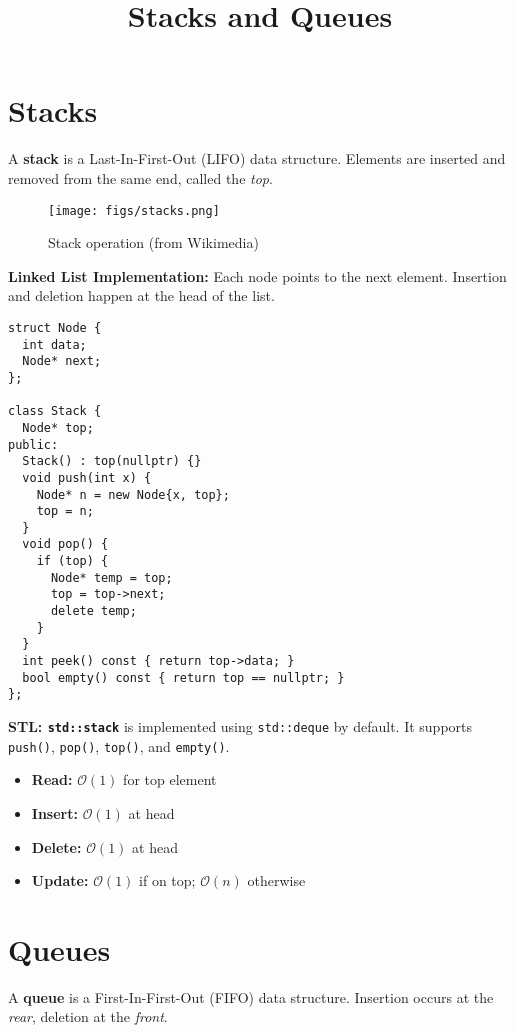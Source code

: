 \documentclass{article}
\title{Stacks and Queues}
\author{}
\date{}
\begin{document}
\maketitle


\section{Stacks}
A \textbf{stack} is a Last-In-First-Out (LIFO) data structure. Elements are inserted and removed from the same end, called the \textit{top}.

\begin{figure}[h]
  \centering
  \texttt{[image: figs/stacks.png]}
  \caption{Stack operation (from Wikimedia)}
  \label{fig:stack}
\end{figure}

\textbf{Linked List Implementation:}
Each node points to the next element. Insertion and deletion happen at the head of the list.

\begin{lstlisting}[style=cppstyle]
struct Node {
  int data;
  Node* next;
};

class Stack {
  Node* top;
public:
  Stack() : top(nullptr) {}
  void push(int x) {
    Node* n = new Node{x, top};
    top = n;
  }
  void pop() {
    if (top) {
      Node* temp = top;
      top = top->next;
      delete temp;
    }
  }
  int peek() const { return top->data; }
  bool empty() const { return top == nullptr; }
};
\end{lstlisting}

\textbf{STL: \texttt{std::stack}} is implemented using \texttt{std::deque} by default. It supports \texttt{push()}, \texttt{pop()}, \texttt{top()}, and \texttt{empty()}.

\begin{itemize}
  \item \textbf{Read:} $\mathcal{O}(1)$ for top element
  \item \textbf{Insert:} $\mathcal{O}(1)$ at head
  \item \textbf{Delete:} $\mathcal{O}(1)$ at head
  \item \textbf{Update:} $\mathcal{O}(1)$ if on top; $\mathcal{O}(n)$ otherwise
\end{itemize}

\section{Queues}
A \textbf{queue} is a First-In-First-Out (FIFO) data structure. Insertion occurs at the \textit{rear}, deletion at the \textit{front}.
\end{document}
